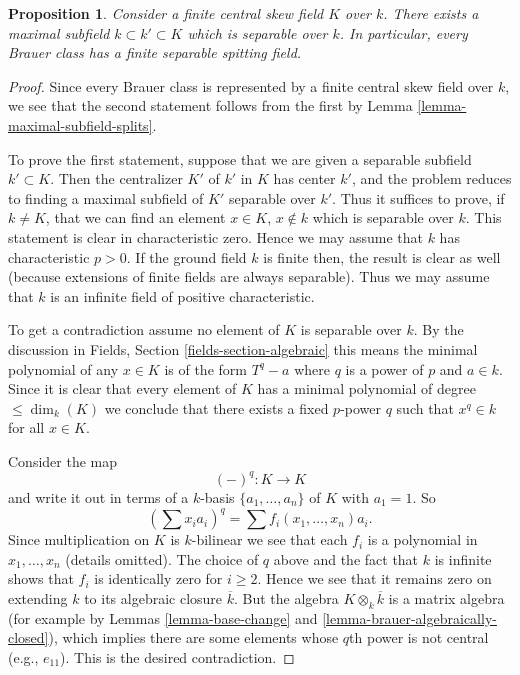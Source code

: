 \documentclass{stacks-project}
\theoremstyle{plain}
\newtheorem{proposition}[subsection]{Proposition}
\theoremstyle{definition}
\theoremstyle{remark}
\numberwithin{equation}{subsection}
\begin{document}
\begin{proposition}
\label{proposition-separable-splitting-field}
Consider a finite central skew field $K$ over $k$.
There exists a maximal subfield $k \subset k' \subset K$ which
is separable over $k$.
In particular, every Brauer class has a finite separable
spitting field.
\end{proposition}

\begin{proof}
Since every Brauer class is represented by a finite central skew
field over $k$, we see that the second statement follows from the
first by
Lemma \ref{lemma-maximal-subfield-splits}.

\medskip\noindent
To prove the first statement, suppose that we are given a separable
subfield $k' \subset K$. Then the centralizer $K'$ of $k'$ in $K$
has center $k'$, and the problem reduces to finding a maximal
subfield of $K'$ separable over $k'$. Thus it suffices to prove, if
$k \not = K$, that we can find an element $x \in K$, $x \not \in k$
which is separable over $k$. This statement is clear in characteristic
zero. Hence we may assume that $k$ has characteristic $p > 0$. If the
ground field $k$ is finite then, the result is clear as well (because
extensions of finite fields are always separable). Thus we may assume
that $k$ is an infinite field of positive characteristic.

\medskip\noindent
To get a contradiction assume no element of $K$ is separable over $k$.
By the discussion in
Fields, Section \ref{fields-section-algebraic}
this means the minimal polynomial of any $x \in K$ is of the form
$T^q - a$ where $q$ is a power of $p$ and $a \in k$. Since it is
clear that every element of $K$ has a minimal polynomial of degree
$\leq \dim_k(K)$ we conclude that there exists a fixed $p$-power
$q$ such that $x^q \in k$ for all $x \in K$.

\medskip\noindent
Consider the map
$$
(-)^q : K \longrightarrow K
$$
and write it out in terms of a $k$-basis $\{a_1, \ldots, a_n\}$ of $K$
with $a_1 = 1$. So
$$
(\sum x_i a_i)^q = \sum f_i(x_1, \ldots, x_n)a_i.
$$
Since multiplication on $K$ is $k$-bilinear we see that each $f_i$
is a polynomial in $x_1, \ldots, x_n$ (details omitted).
The choice of $q$ above and the fact that $k$ is infinite shows that
$f_i$ is identically zero for $i \geq 2$. Hence we see that it remains
zero on extending $k$ to its algebraic closure $\overline{k}$. But the
algebra $K \otimes_k \overline{k}$ is a matrix algebra (for example by
Lemmas \ref{lemma-base-change} and \ref{lemma-brauer-algebraically-closed}),
which implies there are some elements whose $q$th power is not central
(e.g., $e_{11}$). This is the desired contradiction.
\end{proof}
\end{document}
